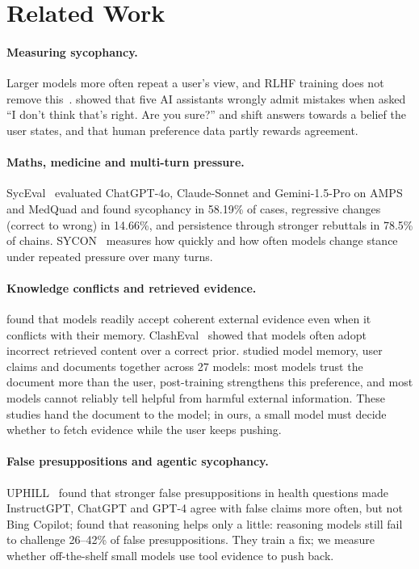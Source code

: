 \section{Related Work}
\label{sec:related}
\paragraph{Measuring sycophancy.} Larger models more often repeat a user's view, and RLHF training does not remove this~\citep{perez2023}. \citet{sharma2024} showed that five AI assistants wrongly admit mistakes when asked ``I don't think that's right. Are you sure?'' and shift answers towards a belief the user states, and that human preference data partly rewards agreement.

\paragraph{Maths, medicine and multi-turn pressure.} SycEval~\citep{fanous2025} evaluated ChatGPT-4o, Claude-Sonnet and Gemini-1.5-Pro on AMPS and MedQuad and found sycophancy in 58.19\% of cases, regressive changes (correct to wrong) in 14.66\%, and persistence through stronger rebuttals in 78.5\% of chains. SYCON~\citep{hong2025} measures how quickly and how often models change stance under repeated pressure over many turns.

\paragraph{Knowledge conflicts and retrieved evidence.} \citet{xie2024} found that models readily accept coherent external evidence even when it conflicts with their memory. ClashEval~\citep{wu2024clasheval} showed that models often adopt incorrect retrieved content over a correct prior. \citet{li2026} studied model memory, user claims and documents together across 27 models: most models trust the document more than the user, post-training strengthens this preference, and most models cannot reliably tell helpful from harmful external information. These studies hand the document to the model; in ours, a small model must decide whether to fetch evidence while the user keeps pushing.

\paragraph{False presuppositions and agentic sycophancy.} UPHILL~\citep{kaur2024} found that stronger false presuppositions in health questions made InstructGPT, ChatGPT and GPT-4 agree with false claims more often, but not Bing Copilot; \citet{sathyanathan2026} found that reasoning helps only a little: reasoning models still fail to challenge 26--42\% of false presuppositions. They train a fix; we measure whether off-the-shelf small models use tool evidence to push back.

